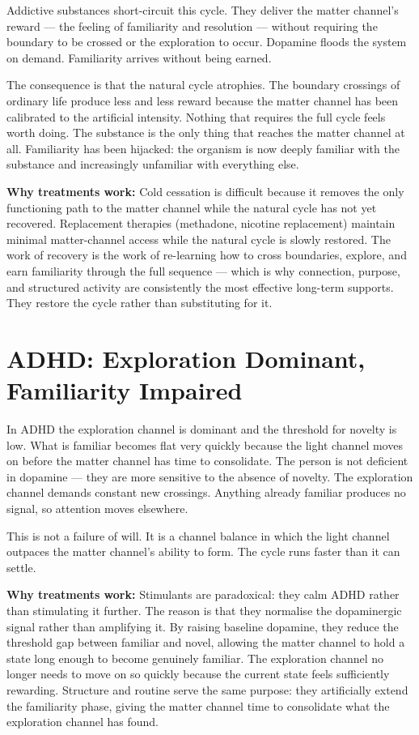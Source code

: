 \documentclass[12pt]{article}
\begin{document}
Addictive substances short-circuit this cycle. They deliver the matter channel's
reward --- the feeling of familiarity and resolution --- without requiring the
boundary to be crossed or the exploration to occur. Dopamine floods the system on
demand. Familiarity arrives without being earned.

The consequence is that the natural cycle atrophies. The boundary crossings of
ordinary life produce less and less reward because the matter channel has been
calibrated to the artificial intensity. Nothing that requires the full cycle feels
worth doing. The substance is the only thing that reaches the matter channel at
all. Familiarity has been hijacked: the organism is now deeply familiar with the
substance and increasingly unfamiliar with everything else.

\textbf{Why treatments work:}
Cold cessation is difficult because it removes the only functioning path to the
matter channel while the natural cycle has not yet recovered. Replacement
therapies (methadone, nicotine replacement) maintain minimal matter-channel
access while the natural cycle is slowly restored. The work of recovery is the
work of re-learning how to cross boundaries, explore, and earn familiarity
through the full sequence --- which is why connection, purpose, and structured
activity are consistently the most effective long-term supports. They restore
the cycle rather than substituting for it.

\section{ADHD: Exploration Dominant, Familiarity Impaired}

In ADHD the exploration channel is dominant and the threshold for novelty is
low. What is familiar becomes flat very quickly because the light channel moves
on before the matter channel has time to consolidate. The person is not
deficient in dopamine --- they are more sensitive to the absence of novelty.
The exploration channel demands constant new crossings. Anything already familiar
produces no signal, so attention moves elsewhere.

This is not a failure of will. It is a channel balance in which the light channel
outpaces the matter channel's ability to form. The cycle runs faster than it can
settle.

\textbf{Why treatments work:}
Stimulants are paradoxical: they calm ADHD rather than stimulating it further.
The reason is that they normalise the dopaminergic signal rather than amplifying
it. By raising baseline dopamine, they reduce the threshold gap between familiar
and novel, allowing the matter channel to hold a state long enough to become
genuinely familiar. The exploration channel no longer needs to move on so quickly
because the current state feels sufficiently rewarding. Structure and routine
serve the same purpose: they artificially extend the familiarity phase, giving
the matter channel time to consolidate what the exploration channel has found.
\end{document}
